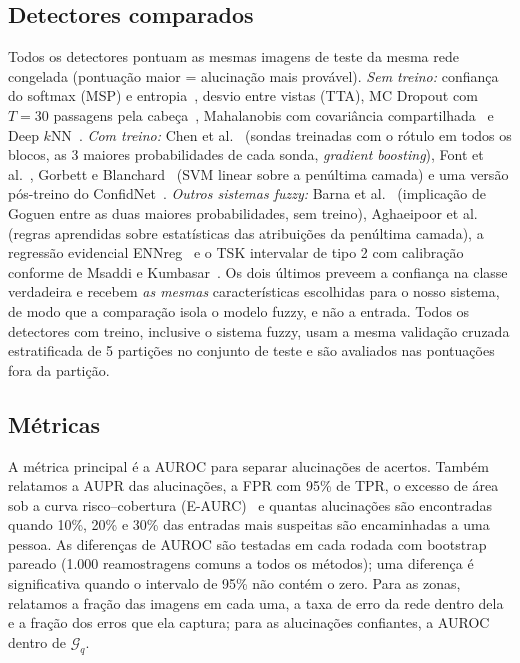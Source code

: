 \subsection{Detectores comparados}
Todos os detectores pontuam as mesmas imagens de teste da mesma rede congelada (pontuação maior = alucinação mais provável).
\emph{Sem treino:} confiança do softmax (MSP) e entropia~\cite{hendrycks2017}, desvio entre vistas (TTA),
MC Dropout com $T=30$ passagens pela cabeça~\cite{gal2016}, Mahalanobis com covariância compartilhada~\cite{lee2018} e Deep $k$NN~\cite{papernot2018}.
\emph{Com treino:} Chen et al.~\cite{chen2019} (sondas treinadas com o rótulo em todos os blocos, as 3 maiores probabilidades de cada sonda, \textit{gradient boosting}),
Font et al.~\cite{font2025}, Gorbett e Blanchard~\cite{gorbett2022} (SVM linear sobre a penúltima camada) e uma versão pós-treino do
ConfidNet~\cite{corbiere2019}.
\emph{Outros sistemas fuzzy:} Barna et al.~\cite{barna2026} (implicação de Goguen entre as duas maiores probabilidades, sem treino),
Aghaeipoor et al.~\cite{aghaeipoor2023} (regras aprendidas sobre estatísticas das atribuições da penúltima camada),
a regressão evidencial ENNreg~\cite{denoeux2023} e o TSK intervalar de tipo 2 com calibração conforme de Msaddi e
Kumbasar~\cite{msaddi2026}. Os dois últimos preveem a confiança na classe verdadeira e recebem \emph{as mesmas} características
escolhidas para o nosso sistema, de modo que a comparação isola o modelo fuzzy, e não a entrada. Todos os detectores com treino, inclusive o sistema fuzzy, usam a mesma validação cruzada estratificada de
5 partições no conjunto de teste e são avaliados nas pontuações fora da partição.

\subsection{Métricas}
A métrica principal é a AUROC para separar alucinações de acertos. Também relatamos a AUPR das alucinações, a FPR com 95\% de TPR, o excesso
de área sob a curva risco--cobertura (E-AURC)~\cite{jaeger2023} e quantas alucinações são encontradas quando 10\%, 20\% e 30\% das entradas
mais suspeitas são encaminhadas a uma pessoa. As diferenças de AUROC são testadas em cada rodada com bootstrap pareado (1.000 reamostragens
comuns a todos os métodos); uma diferença é significativa quando o intervalo de 95\% não contém o zero. Para as zonas, relatamos a fração das imagens em cada uma,
a taxa de erro da rede dentro dela e a fração dos erros que ela captura; para as alucinações confiantes, a AUROC dentro de $\mathcal{G}_q$.

